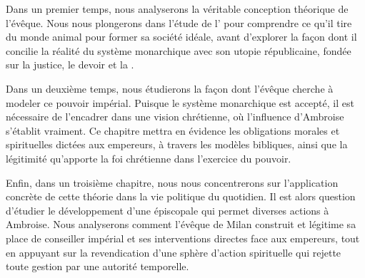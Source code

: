 \bigskip

Dans un premier temps, nous analyserons la véritable conception théorique de l'évêque. Nous nous plongerons dans l'étude de l' pour comprendre ce qu'il tire du monde animal pour former sa société idéale, avant d'explorer la façon dont il concilie la réalité du système monarchique avec son utopie républicaine, fondée sur la justice, le devoir et la .

\bigskip

Dans un deuxième temps, nous étudierons la façon dont l'évêque cherche à modeler ce pouvoir impérial. Puisque le système monarchique est accepté, il est nécessaire de l'encadrer dans une vision chrétienne, où l'influence d'Ambroise s'établit vraiment. Ce chapitre mettra en évidence les obligations morales et spirituelles dictées aux empereurs, à travers les modèles bibliques, ainsi que la légitimité qu'apporte la foi chrétienne dans l'exercice du pouvoir.

\bigskip

Enfin, dans un troisième chapitre, nous nous concentrerons sur l'application concrète de cette théorie dans la vie politique du quotidien. Il est alors question d'étudier le développement d'une  épiscopale qui permet diverses actions à Ambroise. Nous analyserons comment l'évêque de Milan construit et légitime sa place de conseiller impérial et ses interventions directes face aux empereurs, tout en appuyant sur la revendication d'une sphère d'action spirituelle qui rejette toute gestion par une autorité temporelle.

\bigskip
